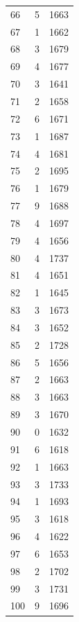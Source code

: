 \documentclass[twocolumn, 11pt]{article} %
\begin{document}
\begin{longtable}{lll}
66        & 5        & 1663     \\
67        & 1        & 1662     \\
68        & 3        & 1679     \\
69        & 4        & 1677     \\
70        & 3        & 1641     \\
71        & 2        & 1658     \\
72        & 6        & 1671     \\
73        & 1        & 1687     \\
74        & 4        & 1681     \\
75        & 2        & 1695     \\
76        & 1        & 1679     \\
77        & 9        & 1688     \\
78        & 4        & 1697     \\
79        & 4        & 1656     \\
80        & 4        & 1737     \\
81        & 4        & 1651     \\
82        & 1        & 1645     \\
83        & 3        & 1673     \\
84        & 3        & 1652     \\
85        & 2        & 1728     \\
86        & 5        & 1656     \\
87        & 2        & 1663     \\
88        & 3        & 1663     \\
89        & 3        & 1670     \\
90        & 0        & 1632     \\
91        & 6        & 1618     \\
92        & 1        & 1663     \\
93        & 3        & 1733     \\
94        & 1        & 1693     \\
95        & 3        & 1618     \\
96        & 4        & 1622     \\
97        & 6        & 1653     \\
98        & 2        & 1702     \\
99        & 3        & 1731     \\
100       & 9        & 1696     \\

\end{longtable}
\end{document}
